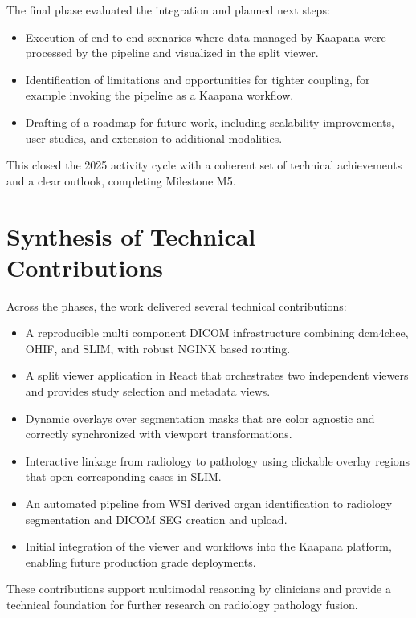 \documentclass[11pt,a4paper]{article}
\begin{document}
The final phase evaluated the integration and planned next steps:

\begin{itemize}
    \item Execution of end to end scenarios where data managed by Kaapana were processed by the pipeline and visualized in the split viewer.
    \item Identification of limitations and opportunities for tighter coupling, for example invoking the pipeline as a Kaapana workflow.
    \item Drafting of a roadmap for future work, including scalability improvements, user studies, and extension to additional modalities.
\end{itemize}

This closed the 2025 activity cycle with a coherent set of technical achievements and a clear outlook, completing Milestone M5.

\section{Synthesis of Technical Contributions}
\label{sec:contrib}

Across the phases, the work delivered several technical contributions:

\begin{itemize}
    \item A reproducible multi component DICOM infrastructure combining dcm4chee, OHIF, and SLIM, with robust NGINX based routing.
    \item A split viewer application in React that orchestrates two independent viewers and provides study selection and metadata views.
    \item Dynamic overlays over segmentation masks that are color agnostic and correctly synchronized with viewport transformations.
    \item Interactive linkage from radiology to pathology using clickable overlay regions that open corresponding cases in SLIM.
    \item An automated pipeline from WSI derived organ identification to radiology segmentation and DICOM SEG creation and upload.
    \item Initial integration of the viewer and workflows into the Kaapana platform, enabling future production grade deployments.
\end{itemize}

These contributions support multimodal reasoning by clinicians and provide a technical foundation for further research on radiology pathology fusion.
\end{document}
